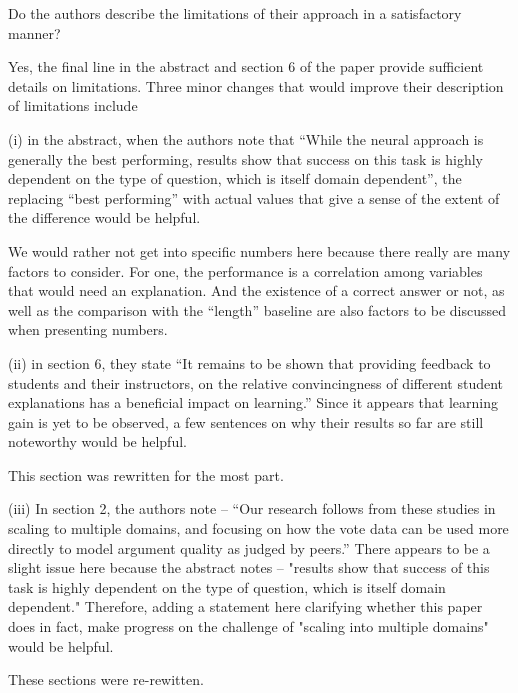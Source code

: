 \documentclass[notitlepage,12pt]{article}
\newcounter{answ}
\begin{document}
    \begin{revcomment}{Do the authors describe the limitations of their approach in a satisfactory manner?}

    Yes, the final line in the abstract and section 6 of the paper provide sufficient details on limitations. Three minor changes that would improve their description of limitations include

    (i) in the abstract, when the authors note that “While the neural approach is generally the best performing, results show that success on this task is highly dependent on the type of question, which is itself domain dependent”, the replacing “best performing” with actual values that give a sense of the extent of the difference would be helpful.

    \begin{authors}
      We would rather not get into specific numbers here because there really are many factors to consider.  For one, the performance is a correlation among variables that would need an explanation.  And the existence of a correct answer or not, as well as the comparison with the ``length'' baseline are also factors to be discussed when presenting numbers.
    \end{authors}

    (ii) in section 6, they state “It remains to be shown that providing feedback to students and their instructors, on the relative convincingness of different student explanations has a beneficial impact on learning.” Since it appears that learning gain is yet to be observed, a few sentences on why their results so far are still noteworthy would be helpful.

    \begin{authors}
      This section was rewritten for the most part.
    \end{authors}

    (iii) In section 2, the authors note -- “Our research follows from these studies in scaling
    to multiple domains, and focusing on how the vote data can be used more directly to model
    argument quality as judged by peers.” There appears to be a slight issue here because the abstract notes -- "results show that success of this task is highly dependent on the type of question, which is itself domain dependent." Therefore, adding a statement here clarifying whether this paper does in fact, make progress on the challenge of "scaling into multiple domains" would be helpful.

    \begin{authors}
      These sections were re-rewitten.
    \end{authors}

    \end{revcomment}
\end{document}
